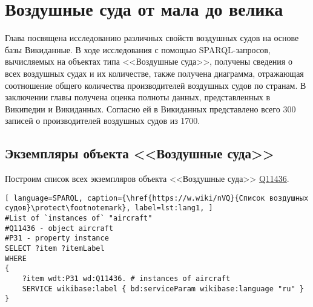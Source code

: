 \chapter{Воздушные суда от мала до велика}%
\label{ch:aircraft-chapter}

Глава посвящена исследованию различных свойств воздушных судов 
на основе базы Викиданные. 
В ходе исследования с помощью SPARQL-запросов, вычисляемых на объектах типа <<Воздушные суда>>, 
получены сведения о всех воздушных судах и их количестве, 
также получена диаграмма, отражающая соотношение общего количества производителей воздушных судов по странам. 
В заключении главы получена оценка полноты данных, представленных в Википедии и Викиданных. Согласно ей в Викиданных представлено всего 300 записей о производителей воздушных судов из 1700.

\section{Экземпляры объекта <<Воздушные суда>>}

Построим список всех экземпляров объекта <<Воздушные суда>> \href{https://www.wikidata.org/wiki/Q11436}{Q11436}.


\begin{lstlisting}[ language=SPARQL, caption={\href{https://w.wiki/nVQ}{Список воздушных судов}\protect\footnotemark}, label=lst:lang1, ]
#List of `instances of` "aircraft"
#Q11436 - object aircraft
#P31 - property instance
SELECT ?item ?itemLabel
WHERE
{
    ?item wdt:P31 wd:Q11436. # instances of aircraft
    SERVICE wikibase:label { bd:serviceParam wikibase:language "ru" }
}
\end{lstlisting}


